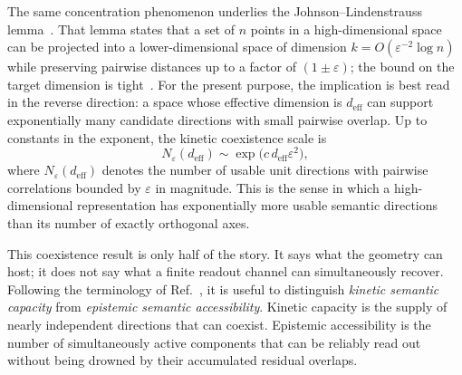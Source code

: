 \documentclass[%
  reprint,
  superscriptaddress,
  showpacs,
  showkeys,
  amsmath,amssymb,
  pra,
  longbibliography,
  floatfix,
  x11names
]{revtex4-2}
\begin{document}
The same concentration phenomenon underlies the Johnson--Lindenstrauss lemma~\cite{johnson-1984}. That lemma states that a set of $n$ points in a high-dimensional space can be projected into a lower-dimensional space of dimension $k=O(\varepsilon^{-2}\log n)$ while preserving pairwise distances up to a factor of $(1\pm\varepsilon)$; the bound on the target dimension is tight~\cite{alon2016optimal,larsen-nelson-2017}. For the present purpose, the implication is best read in the reverse direction: a space whose effective dimension is $d_{\mathrm{eff}}$ can support exponentially many candidate directions with small pairwise overlap. Up to constants in the exponent, the kinetic coexistence scale is
\begin{equation}
  N_\varepsilon(d_{\mathrm{eff}})
  \sim \exp\!\bigl(c\,d_{\mathrm{eff}}\varepsilon^2\bigr),
\end{equation}
where $N_\varepsilon(d_{\mathrm{eff}})$ denotes the number of usable unit directions with pairwise correlations bounded by $\varepsilon$ in magnitude. This is the sense in which a high-dimensional representation has exponentially more usable semantic directions than its number of exactly orthogonal axes.

This coexistence result is only half of the story. It says what the geometry can host; it does not say what a finite readout channel can simultaneously recover. Following the terminology of Ref.~\cite{svozil-2026-llm}, it is useful to distinguish \emph{kinetic semantic capacity} from \emph{epistemic semantic accessibility}. Kinetic capacity is the supply of nearly independent directions that can coexist. Epistemic accessibility is the number of simultaneously active components that can be reliably read out without being drowned by their accumulated residual overlaps.
\end{document}

